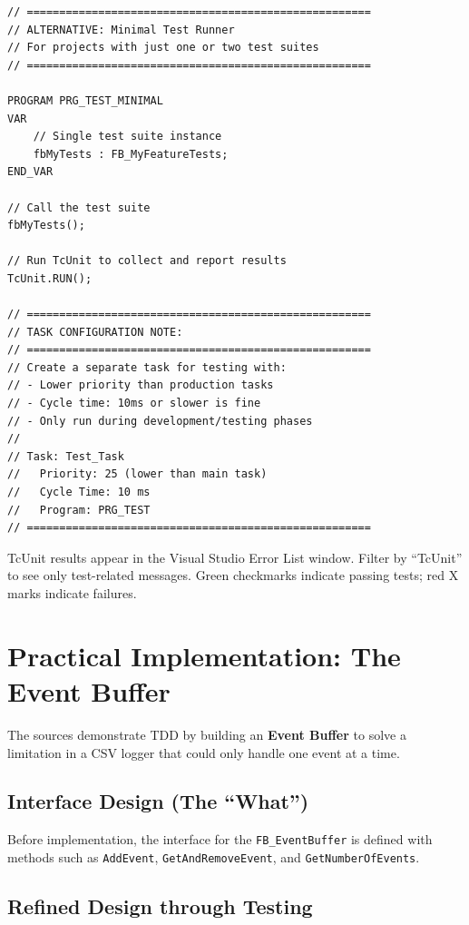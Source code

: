 \documentclass[11pt,a4paper]{article}
\begin{document}
\begin{lstlisting}
// =====================================================
// ALTERNATIVE: Minimal Test Runner
// For projects with just one or two test suites
// =====================================================

PROGRAM PRG_TEST_MINIMAL
VAR
    // Single test suite instance
    fbMyTests : FB_MyFeatureTests;
END_VAR

// Call the test suite
fbMyTests();

// Run TcUnit to collect and report results
TcUnit.RUN();

// =====================================================
// TASK CONFIGURATION NOTE:
// =====================================================
// Create a separate task for testing with:
// - Lower priority than production tasks
// - Cycle time: 10ms or slower is fine
// - Only run during development/testing phases
//
// Task: Test_Task
//   Priority: 25 (lower than main task)
//   Cycle Time: 10 ms
//   Program: PRG_TEST
// =====================================================
\end{lstlisting}

\begin{notebox}
TcUnit results appear in the Visual Studio Error List window. Filter by ``TcUnit'' to see only test-related messages. Green checkmarks indicate passing tests; red X marks indicate failures.
\end{notebox}

\section{Practical Implementation: The Event Buffer}

The sources demonstrate TDD by building an \textbf{Event Buffer} to solve a limitation in a CSV logger that could only handle one event at a time.

\subsection{Interface Design (The ``What'')}

Before implementation, the interface for the \texttt{FB\_EventBuffer} is defined with methods such as \texttt{AddEvent}, \texttt{GetAndRemoveEvent}, and \texttt{GetNumberOfEvents}.

\subsection{Refined Design through Testing}
\end{document}
